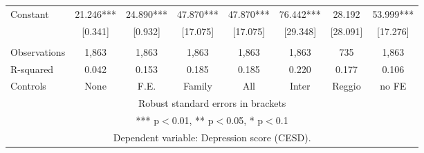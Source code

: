 \begin{tabular}{lccccccc}
Constant & 21.246*** & 24.890*** & 47.870*** & 47.870*** & 76.442*** & 28.192 & 53.999*** \\
 & [0.341] & [0.932] & [17.075] & [17.075] & [29.348] & [28.091] & [17.276] \\
 &  &  &  &  &  &  &  \\
Observations & 1,863 & 1,863 & 1,863 & 1,863 & 1,863 & 735 & 1,863 \\
R-squared & 0.042 & 0.153 & 0.185 & 0.185 & 0.220 & 0.177 & 0.106 \\
 Controls & None & F.E. & Family & All & Inter & Reggio & no FE \\ \hline
\multicolumn{8}{c}{ Robust standard errors in brackets} \\
\multicolumn{8}{c}{ *** p$<$0.01, ** p$<$0.05, * p$<$0.1} \\
\multicolumn{8}{c}{ Dependent variable: Depression score (CESD).} \\
\end{tabular}
